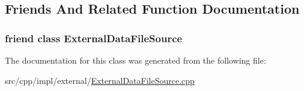 \subsection{Friends And Related Function Documentation}
\hypertarget{classBUSBOY_1_1ExternalDataFileSourceImpl_a987546c386fad7e10e7a33b1650e4a9a}{
\subsubsection[{ExternalDataFileSource}]{\setlength{\rightskip}{0pt plus 5cm}friend class {\bf ExternalDataFileSource}}}
\label{classBUSBOY_1_1ExternalDataFileSourceImpl_a987546c386fad7e10e7a33b1650e4a9a}


The documentation for this class was generated from the following file:\begin{DoxyCompactItemize}
\item 
src/cpp/impl/external/\hyperlink{ExternalDataFileSource_8cpp}{ExternalDataFileSource.cpp}\end{DoxyCompactItemize}
